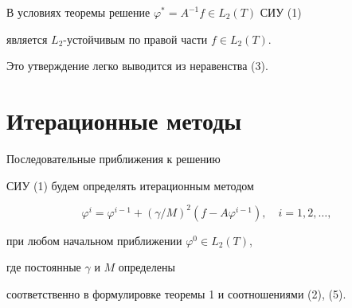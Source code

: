 \begin{cornonum}


В условиях теоремы решение $ \varphi ^\ast =A^{-1}f \in L_2(T) $ СИУ (1)


является $L_2$-устой\-чивым по правой части $ f\in L_2(T)$.


\end{cornonum}





Это утверждение легко выводится из неравенства (3).








\section{Итерационные методы}





Последовательные приближения к решению


СИУ (1) будем определять итерационным методом


\begin{equation}


\varphi ^i=\varphi ^{i-1}+(\gamma /M)^2(f-A\varphi ^{i-1}),\quad


i=1, 2,\dotsc,


\end{equation}


при любом начальном приближении $ \varphi^0\in L_2(T)$,


где постоянные $\gamma$ и $M$ определены


соответственно в формулировке теоремы 1 и соотношениями (2), (5).








